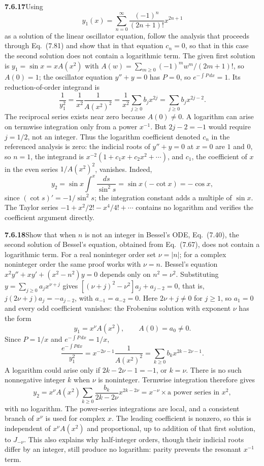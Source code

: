 \par\bigskip
\noindent\textbf{7.6.17}\quad Using
\[
y_{1}(x)=\sum_{n=0}^{\infty}\frac{(-1)^{n}}{(2n+1)!}x^{2n+1}
\]
as a solution of the linear oscillator equation, follow the analysis that
proceeds through Eq.~(7.81) and show that in that equation $c_{n}=0$, so that
in this case the second solution does not contain a logarithmic term.
\solution
The given first solution is $y_1=\sin x=xA(x^2)$ with
$A(w)=\sum_{m\ge0}(-1)^mw^m/(2m+1)!$, so $A(0)=1$; the oscillator
equation $y''+y=0$ has $P=0$, so $e^{-\int P\,dx}=1$.
Its reduction-of-order integrand is
\[
\frac1{y_1^2}=\frac1{x^2}\frac1{A(x^2)^2}
=\frac1{x^2}\sum_{j\ge0}b_jx^{2j}
=\sum_{j\ge0}b_jx^{2j-2}.
\]
The reciprocal series exists near zero because $A(0)\ne0$.
A logarithm can arise on termwise integration only from a power
$x^{-1}$. But $2j-2=-1$ would require $j=1/2$, not an integer.
Thus the logarithm coefficient denoted $c_n$ in the referenced analysis
is zero: the indicial roots of $y''+y=0$ at $x=0$ are $1$ and $0$, so
$n=1$, the integrand is $x^{-2}(1+c_1x+c_2x^2+\cdots)$, and $c_1$, the
coefficient of $x$ in the even series $1/A(x^2)^2$, vanishes. Indeed,
\[
y_2=\sin x\int^x\frac{ds}{\sin^2s}
=\sin x(-\cot x)=-\cos x,
\]
since $(\cot s)'=-1/\sin^2s$; the integration constant adds a multiple
of $\sin x$. The Taylor series
$-1+x^2/2!-x^4/4!+\cdots$ contains no logarithm and verifies the
coefficient argument directly.

\par\bigskip
\noindent\textbf{7.6.18}\quad Show that when $n$ is not an integer in Bessel's
ODE, Eq.~(7.40), the second solution of Bessel's equation, obtained from
Eq.~(7.67), does not contain a logarithmic term.
\solution
For a real noninteger order set $\nu=|n|$; for a complex noninteger
order the same proof works with $\nu=n$. Bessel's equation
$x^2y''+xy'+(x^2-n^2)y=0$ depends only on $n^2=\nu^2$. Substituting
$y=\sum_{j\ge0}a_jx^{\nu+j}$ gives $[(\nu+j)^2-\nu^2]a_j+a_{j-2}=0$,
that is, $j(2\nu+j)a_j=-a_{j-2}$, with $a_{-1}=a_{-2}=0$. Here
$2\nu+j\ne0$ for $j\ge1$, so $a_1=0$ and every odd coefficient
vanishes: the Frobenius solution with exponent $\nu$ has the form
\[
y_1=x^\nu A(x^2),\qquad A(0)=a_0\ne0.
\]
Since $P=1/x$ and $e^{-\int P\,dx}=1/x$,
\[
\frac{e^{-\int Pdx}}{y_1^2}
=x^{-2\nu-1}\frac1{A(x^2)^2}
=\sum_{k\ge0}b_kx^{2k-2\nu-1}.
\]
A logarithm could arise only if $2k-2\nu-1=-1$, or $k=\nu$.
There is no such nonnegative integer $k$ when $\nu$ is noninteger.
Termwise integration therefore gives
\[
y_2=x^\nu A(x^2)\sum_{k\ge0}
\frac{b_k}{2k-2\nu}x^{2k-2\nu}
=x^{-\nu}\times\text{a power series in }x^2,
\]
with no logarithm. The power-series integrations are local, and a
consistent branch of $x^\nu$ is used for complex $x$.
The leading coefficient is nonzero, so this is
independent of $x^\nu A(x^2)$ and proportional, up to addition of that
first solution, to $J_{-\nu}$. This also explains why half-integer
orders, though their indicial roots differ by an integer, still produce
no logarithm: parity prevents the resonant $x^{-1}$ term.

